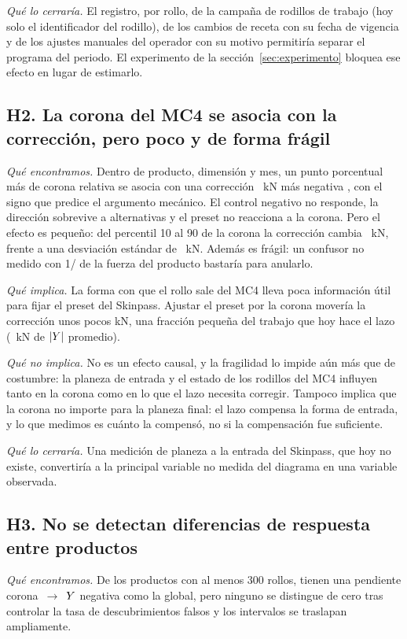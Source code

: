 \emph{Qué lo cerraría.} El registro, por rollo, de la campaña de rodillos de trabajo (hoy solo el identificador del
rodillo), de los cambios de receta con su fecha de vigencia y de los ajustes manuales del operador con su motivo
permitiría separar el programa del periodo. El experimento de la sección~\ref{sec:experimento} bloquea ese efecto en
lugar de estimarlo.

\subsection{H2. La corona del MC4 se asocia con la corrección, pero poco y de forma frágil}
\emph{Qué encontramos.} Dentro de producto, dimensión y mes, un punto porcentual más de corona relativa se asocia con
una corrección \PendCorona~kN más negativa \PendCoronaIC, con el signo que predice el argumento mecánico. El control
negativo no responde, la dirección sobrevive a \NVariantes{} alternativas y el preset no reacciona a la corona. Pero el
efecto es pequeño: del percentil 10 al 90 de la corona la corrección cambia \VDosCambio~kN, frente a una desviación
estándar de \YDEAsoc~kN. Además es frágil: un confusor no medido con 1/\CHUnoEntre{} de la fuerza del producto bastaría
para anularlo.

\emph{Qué implica.} La forma con que el rollo sale del MC4 lleva poca información útil para fijar el preset del
Skinpass. Ajustar el preset por la corona movería la corrección unos pocos kN, una fracción pequeña del trabajo que
hoy hace el lazo (\ExpAbsY~kN de $|Y|$ promedio).

\emph{Qué no implica.} No es un efecto causal, y la fragilidad lo impide aún más que de costumbre: la planeza de
entrada y el estado de los rodillos del MC4 influyen tanto en la corona como en lo que el lazo necesita corregir. Tampoco
implica que la corona no importe para la planeza final: el lazo compensa la forma de entrada, y lo que medimos es cuánto
la compensó, no si la compensación fue suficiente.

\emph{Qué lo cerraría.} Una medición de planeza a la entrada del Skinpass, que hoy no existe, convertiría a la principal
variable no medida del diagrama en una variable observada.

\subsection{H3. No se detectan diferencias de respuesta entre productos}
\emph{Qué encontramos.} De los \NProdHet{} productos con al menos 300 rollos, \NProdNeg{} tienen una pendiente
corona~$\rightarrow$~$Y$ negativa como la global, pero ninguno se distingue de cero tras controlar la tasa de
descubrimientos falsos y los intervalos se traslapan ampliamente.

